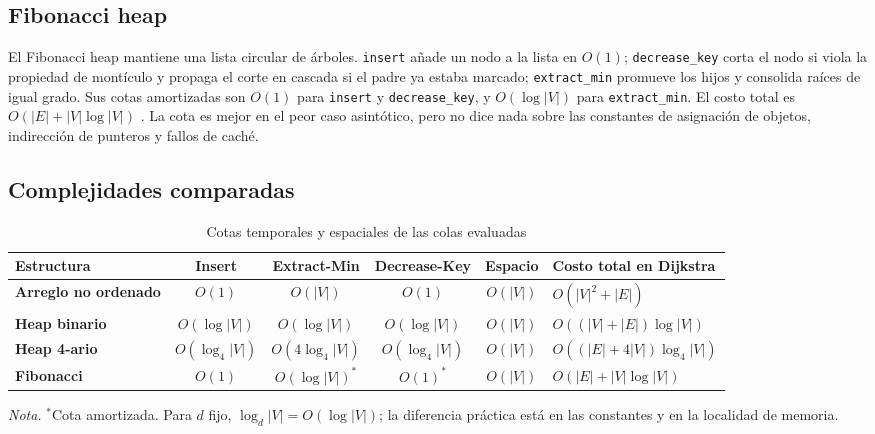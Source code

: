 \subsection{Fibonacci heap}
El Fibonacci heap mantiene una lista circular de árboles. \texttt{insert} añade un nodo a la lista en $O(1)$; \texttt{decrease\_key} corta el nodo si viola la propiedad de montículo y propaga el corte en cascada si el padre ya estaba marcado; \texttt{extract\_min} promueve los hijos y consolida raíces de igual grado. Sus cotas amortizadas son $O(1)$ para \texttt{insert} y \texttt{decrease\_key}, y $O(\log |V|)$ para \texttt{extract\_min}. El costo total es $O(|E|+|V|\log|V|)$ \parencite{fredman1987fibonacci}. La cota es mejor en el peor caso asintótico, pero no dice nada sobre las constantes de asignación de objetos, indirección de punteros y fallos de caché.

\subsection{Complejidades comparadas}
\begin{table}[H]
    \centering
    \fontsize{9}{11}\selectfont
    \renewcommand{\arraystretch}{1.18}
    \setlength{\tabcolsep}{3.5pt}
    \caption{Cotas temporales y espaciales de las colas evaluadas}
    \label{tab:complejidades}
    \begin{tabularx}{\textwidth}{@{}>{\bfseries}l cccc >{\raggedright\arraybackslash}X@{}}
        \toprule
        \textbf{Estructura} & \textbf{Insert} & \textbf{Extract-Min} & \textbf{Decrease-Key} & \textbf{Espacio} & \textbf{Costo total en Dijkstra} \\
        \midrule
        Arreglo no ordenado & $O(1)$ & $O(|V|)$ & $O(1)$ & $O(|V|)$ & $O(|V|^2+|E|)$ \\
        Heap binario & $O(\log |V|)$ & $O(\log |V|)$ & $O(\log |V|)$ & $O(|V|)$ & $O((|V|+|E|)\log |V|)$ \\
        Heap 4-ario & $O(\log_4 |V|)$ & $O(4\log_4 |V|)$ & $O(\log_4 |V|)$ & $O(|V|)$ & $O((|E|+4|V|)\log_4 |V|)$ \\
        Fibonacci & $O(1)$ & $O(\log |V|)^*$ & $O(1)^*$ & $O(|V|)$ & $O(|E|+|V|\log |V|)$ \\
        \bottomrule
    \end{tabularx}
    \par\vspace{0.1cm}
    \raggedright\fontsize{8.5}{10.5}\selectfont\textit{Nota.} $^*$Cota amortizada. Para $d$ fijo, $\log_d |V|=O(\log |V|)$; la diferencia práctica está en las constantes y en la localidad de memoria.
\end{table}

